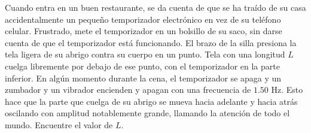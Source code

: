 \item Cuando entra en un buen restaurante, se da cuenta de que se ha traído de su casa accidentalmente un pequeño temporizador electrónico en vez de su teléfono celular. Frustrado, mete el temporizador en un bolsillo de su saco, sin darse cuenta de que el temporizador está funcionando. El brazo de la silla presiona la tela ligera de su abrigo contra su cuerpo en un punto. Tela con una longitud $L$ cuelga libremente por debajo de ese punto, con el temporizador en la parte inferior. En algún momento durante la cena, el temporizador se apaga y un zumbador y un vibrador encienden y apagan con una frecuencia de $1.50\text{ Hz}$. Esto hace que la parte que cuelga de su abrigo se mueva hacia adelante y hacia atrás oscilando con amplitud notablemente grande, llamando la atención de todo el mundo. Encuentre el valor de $L$.